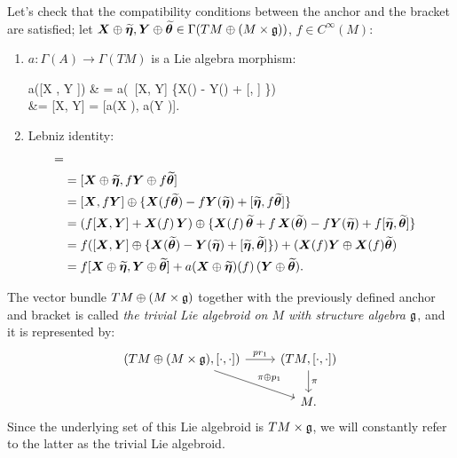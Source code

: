 Let's check that the compatibility conditions between the anchor and the bracket are satisfied; let $\bm{X} \oplus \widetilde{\bm{\eta}}, \bm{Y} \oplus \widetilde{\bm{\theta}} \in \Gamma(TM \oplus (M \times \mathfrak{g}))$, $f \in C^\infty(M)$:
    \begin{enumerate}
    \item $a: \Gamma(A) \to \Gamma(TM)$ is a Lie algebra morphism: 
    \begin{eqnsplit*}
    a([\sect X \oplus \stilde \eta, \sect Y \oplus \stilde \theta]) 
   & = a(\, [\sect X, \sect Y] \oplus \{\sect X(\stilde \theta) - \sect Y(\stilde \eta) + [\stilde \eta, \stilde \theta]  \}) \\
    &= [\sect X, \sect Y] 
    = [a(\sect X \oplus \stilde \eta), a(\sect Y \oplus \stilde \theta)].    
    \end{eqnsplit*}
    
    
    \item Lebniz identity: 
    \begin{align*}
        [\sect X \oplus &\stilde \eta, f\, (\sect Y \oplus \stilde \theta)] =\\
        &= [\sect X \oplus \stilde \eta, f\sect Y \oplus f\stilde \theta] \\
        &=  [\sect X, f\sect Y] \oplus \{\sect X(f\stilde \theta) - f\sect Y(\stilde \eta) + [\stilde \eta, f\stilde \theta]\} \\
        &= (f[\sect X, \sect Y] + \sect X(f)\,\sect Y) \oplus \{\sect X(f)\,\stilde \theta + f\,\sect X(\stilde \theta) - f\sect Y(\stilde \eta) + f[\stilde \eta, \stilde \theta]\} \\
        &=f([\sect X, \sect Y] \oplus \{ \sect X(\stilde \theta) -\sect Y(\stilde \eta) + [\stilde \eta, \stilde \theta]\} ) + (\sect X(f) \sect Y \oplus \sect X(f)\stilde \theta) \\
        &= f[\sect X \oplus \stilde \eta, \sect Y \oplus \stilde \theta] + a(\sect X \oplus \stilde \eta)(f) \, (\sect Y \oplus \stilde \theta).
    \end{align*}
    \end{enumerate}

The vector bundle $TM \oplus (M \times \mathfrak{g})$ together with the previously defined anchor and bracket is called \emph{the trivial Lie algebroid on $M$ with structure algebra $\mathfrak{g}$}, and it is represented by:
\begin{equation}
    \begin{tikzcd}
    (TM \oplus (M \times \alg g), [\cdot, \cdot]) \arrow{r}{pr_1} \arrow{dr}{\pi \oplus p_1} & (TM, [\cdot, \cdot]) \arrow{d}{\pi}\\
    & M.
    \end{tikzcd}
\end{equation}
Since the underlying set of this Lie algebroid is $TM \times \mathfrak{g}$, we will constantly refer to the latter as the trivial Lie algebroid.

